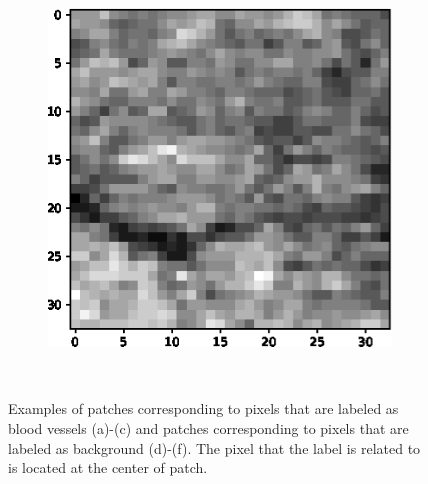 \documentclass[aps,prb,10pt,twocolumn,groupedaddress]{revtex4-1}
\begin{document}
\begin{figure}[!t]
\begin{subfigure}[]{0.22\textwidth}
		\caption{}
	\end{subfigure}
	\hspace{1.55cm}
	\centering
	\begin{subfigure}[]{0.22\textwidth}
		\centering
		\includegraphics[width=\textwidth]{images/negative3.eps}
		\caption{}
	\end{subfigure}\\
	\caption{Examples of patches corresponding to pixels that are labeled as blood vessels (a)-(c) and patches corresponding to pixels that are labeled as background (d)-(f). The pixel that the label is related to is located at the center of patch.}
	\label{fig:example_patches}
\end{figure}
\end{document}
